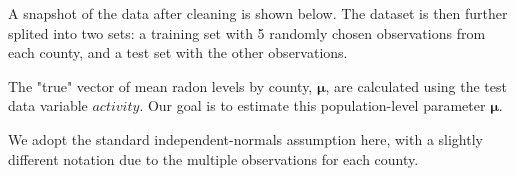 \documentclass{article}
\begin{document}



A snapshot of the data after cleaning is shown below.
The dataset is then further splited into two sets:
a training set with 5 randomly chosen observations from
each county, and a test set with the other observations.

The "true" vector of mean radon levels by county, $\bm{\mu}$, are calculated
using the test data variable $activity$. Our goal is to estimate this
population-level parameter $\bm{\mu}$.


We adopt the standard independent-normals assumption here, with a slightly
different notation due to the multiple observations for each county.
\end{document}
